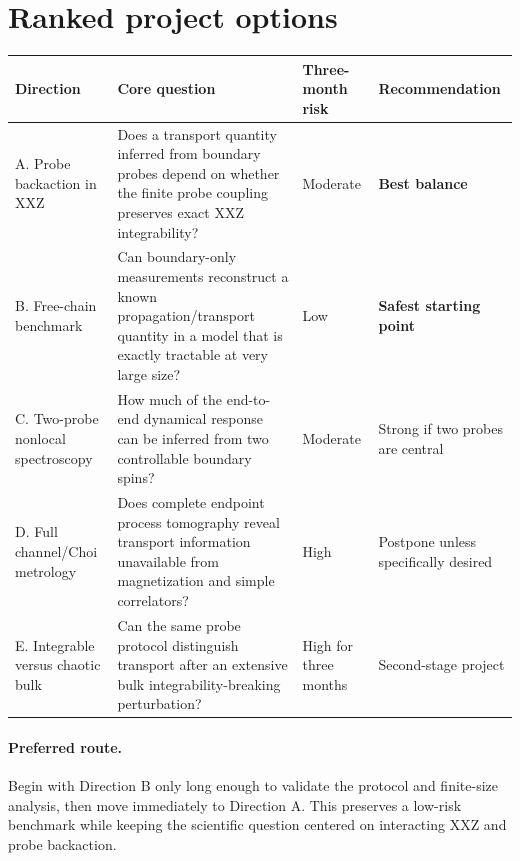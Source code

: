 \documentclass[11pt,a4paper]{article}
\begin{document}
\section{Ranked project options}

\begin{center}
\small
\begin{tabularx}{0.98\textwidth}{@{}p{2.4cm}X p{2.3cm} p{2.1cm}@{}}
\toprule
\textbf{Direction} & \textbf{Core question} & \textbf{Three-month risk} & \textbf{Recommendation} \\
\midrule
A. Probe backaction in XXZ
& Does a transport quantity inferred from boundary probes depend on whether the finite probe coupling preserves exact XXZ integrability?
& Moderate
& \textbf{Best balance} \\
\addlinespace
B. Free-chain benchmark
& Can boundary-only measurements reconstruct a known propagation/transport quantity in a model that is exactly tractable at very large size?
& Low
& \textbf{Safest starting point} \\
\addlinespace
C. Two-probe nonlocal spectroscopy
& How much of the end-to-end dynamical response can be inferred from two controllable boundary spins?
& Moderate
& Strong if two probes are central \\
\addlinespace
D. Full channel/Choi metrology
& Does complete endpoint process tomography reveal transport information unavailable from magnetization and simple correlators?
& High
& Postpone unless specifically desired \\
\addlinespace
E. Integrable versus chaotic bulk
& Can the same probe protocol distinguish transport after an extensive bulk integrability-breaking perturbation?
& High for three months
& Second-stage project \\
\bottomrule
\end{tabularx}
\end{center}

\paragraph{Preferred route.}
Begin with Direction B only long enough to validate the protocol and finite-size analysis, then move immediately to Direction A.  This preserves a low-risk benchmark while keeping the scientific question centered on interacting XXZ and probe backaction.

\end{document}
